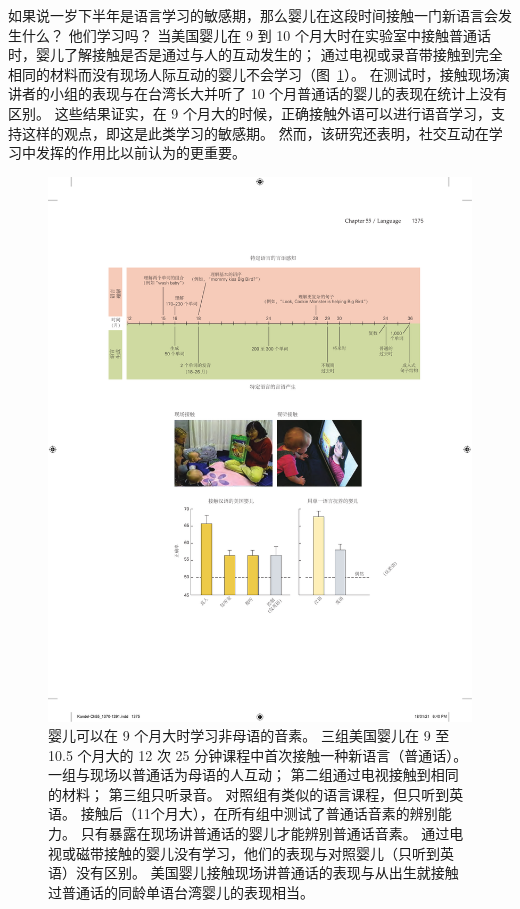 如果说一岁下半年是语言学习的敏感期，那么婴儿在这段时间接触一门新语言会发生什么？
他们学习吗？
当美国婴儿在 9 到 10 个月大时在实验室中接触普通话时，婴儿了解接触是否是通过与人的互动发生的；
通过电视或录音带接触到完全相同的材料而没有现场人际互动的婴儿不会学习（图~\ref{fig:55_3}）。
在测试时，接触现场演讲者的小组的表现与在台湾长大并听了 10 个月普通话的婴儿的表现在统计上没有区别。 这些结果证实，在 9 个月大的时候，正确接触外语可以进行语音学习，支持这样的观点，即这是此类学习的敏感期。
然而，该研究还表明，社交互动在学习中发挥的作用比以前认为的更重要。


\begin{figure}[htbp]
	\centering
	\includegraphics[width=1.0\linewidth]{chap55/fig_55_3}
	\caption{婴儿可以在 9 个月大时学习非母语的音素。
		三组美国婴儿在 9 至 10.5 个月大的 12 次 25 分钟课程中首次接触一种新语言（普通话）。
		一组与现场以普通话为母语的人互动；
		第二组通过电视接触到相同的材料；
		第三组只听录音。
		对照组有类似的语言课程，但只听到英语。
		接触后（11个月大），在所有组中测试了普通话音素的辨别能力\cite{kuhl2003foreign}。
		只有暴露在现场讲普通话的婴儿才能辨别普通话音素。
		通过电视或磁带接触的婴儿没有学习，他们的表现与对照婴儿（只听到英语）没有区别。
		美国婴儿接触现场讲普通话的表现与从出生就接触过普通话的同龄单语台湾婴儿的表现相当。}
	\label{fig:55_3}
\end{figure}


